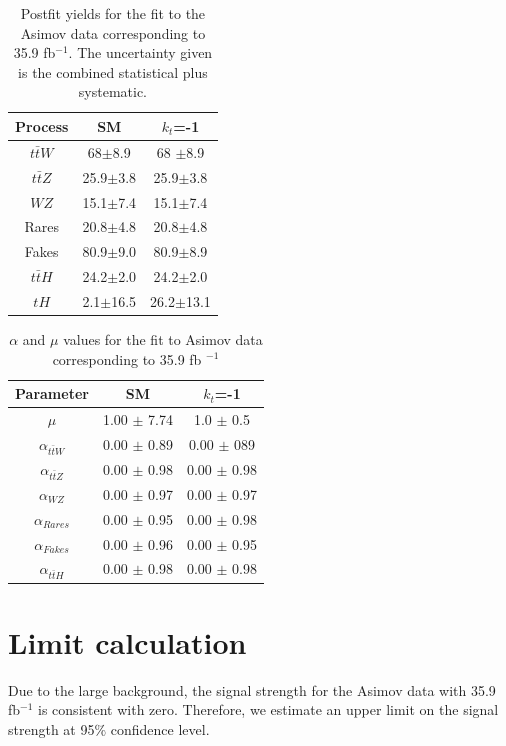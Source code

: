 	\begin{table}[ht!]
		\centering
		\caption{Postfit yields for the fit to the Asimov data corresponding to 35.9 fb$^{-1}$. The uncertainty given is the combined statistical plus systematic.}
		\begin{tabular}{ccc}
			\hline
			Process & SM & $k_{t}$=-1 \\
			\hline
			$t\bar{t}W$ & 68$\pm$8.9& 68 $\pm$8.9 \\
			$t\bar{t}Z$ & 25.9$\pm$3.8&25.9$\pm$3.8\\
			$WZ$ & 15.1$\pm$7.4& 15.1$\pm$7.4\\
			Rares & 20.8$\pm$4.8& 20.8$\pm$4.8 \\
			Fakes & 80.9$\pm$9.0& 80.9$\pm$8.9 \\
			$t\bar{t}H$ & 24.2$\pm$2.0 & 24.2$\pm$2.0 \\
			\hline
			$tH$& 2.1$\pm$16.5 &26.2$\pm$13.1 
		\end{tabular}
		\label{table1}
	\end{table}
	
	
	\begin{table}[ht!]
		\small
		\centering
		\caption{$\alpha$ and $\mu$ values for the fit to Asimov data corresponding to 35.9 fb $^{-1}$}
		\begin{tabular}{ccc}
			\hline
			Parameter & SM &$k_t$=-1\\
			\hline
			$\mu$ & 1.00 $\pm$ 7.74& 1.0 $\pm$ 0.5\\
			$\alpha_{t\bar{t}W}$& 0.00 $\pm$ 0.89& 0.00 $\pm$ 089\\
			$\alpha_{t\bar{t}Z}$ & 0.00 $\pm$ 0.98& 0.00 $\pm$ 0.98\\
			$\alpha_{WZ}$ & 0.00 $\pm$ 0.97& 0.00 $\pm$ 0.97\\
			$\alpha_{Rares}$ &0.00 $\pm$ 0.95&0.00 $\pm$ 0.98 \\
			$\alpha_{Fakes}$ & 0.00 $\pm$ 0.96& 0.00 $\pm$ 0.95\\
			$\alpha_{t\bar{t}H}$ &0.00 $\pm$ 0.98& 0.00 $\pm$ 0.98\\
		\end{tabular}
		\label{parameters}
	\end{table}
	
	\pagebreak
	\section{Limit calculation}
	Due to the large background, the signal strength for the Asimov data with 35.9 fb$^{-1}$ is consistent with zero.
	Therefore, we estimate an upper limit on the signal strength at 95$\%$ confidence level.\\
	
